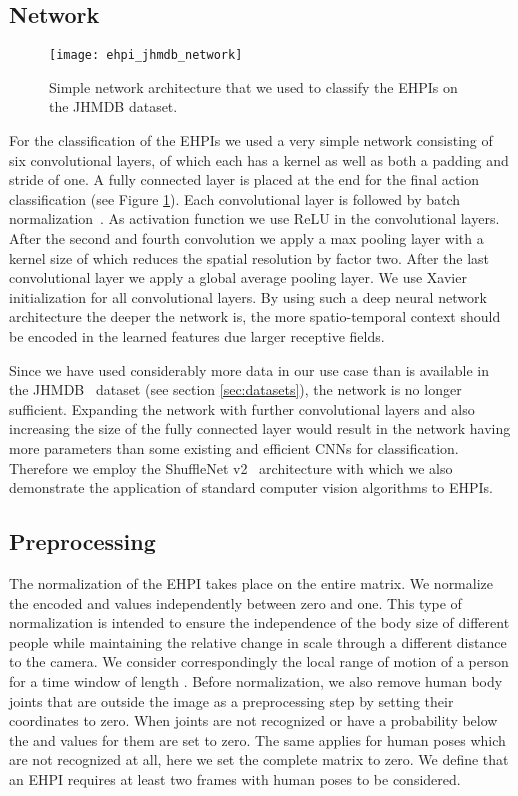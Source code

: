 \documentclass[a4paper, 10pt, conference]{ieeeconf}
\begin{document}
\begin{minipage}{\textwidth}
\subsection{Network}
\begin{figure}
  \centering
  \texttt{[image: ehpi\_jhmdb\_network]}
  \caption{Simple network architecture that we used to classify the EHPIs on the JHMDB dataset.}
  \label{fig:ehpi_jhmdb_network}
\end{figure}
For the classification of the EHPIs we used a very simple network consisting of six convolutional layers, of which each has a  kernel as well as both a padding and stride of one. A fully connected layer is placed at the end for the final action classification (see Figure \ref{fig:ehpi_jhmdb_network}). Each convolutional layer is followed by batch normalization~\cite{ioffeBatchNormalizationAccelerating2015}. As activation function we use ReLU in the convolutional layers. After the second and fourth convolution we apply a max pooling layer with a kernel size of  which reduces the spatial resolution by factor two. After the last convolutional layer we apply a global average pooling layer. We use Xavier initialization \cite{glorotUnderstandingDifficultyTraining2010} for all convolutional layers. By using such a deep neural network architecture the deeper the network is, the more spatio-temporal context should be encoded in the learned features due larger receptive fields.

Since we have used considerably more data in our use case than is available in the JHMDB~\cite{jhuangUnderstandingActionRecognition2013} dataset (see section \ref{sec:datasets}), the network is no longer sufficient. Expanding the network with further convolutional layers and also increasing the size of the fully connected layer would result in the network having more parameters than some existing and efficient CNNs for classification. Therefore we employ the ShuffleNet v2~\cite{maShuffleNetV2Practical2018} architecture with which we also demonstrate the application of standard computer vision algorithms to EHPIs.

\subsection{Preprocessing}
\label{subsec:preprocessing}
The normalization of the EHPI takes place on the entire  matrix. We normalize the encoded  and  values independently between zero and one. This type of normalization is intended to ensure the independence of the body size of different people while maintaining the relative change in scale through a different distance to the camera. We consider correspondingly the local range of motion of a person for a time window of length . Before normalization, we also remove human body joints that are outside the image as a preprocessing step by setting their coordinates to zero. When joints are not recognized or have a probability below  the  and  values for them are set to zero. The same applies for human poses which are not recognized at all, here we set the complete  matrix to zero. We define that an EHPI requires at least two frames with human poses to be considered.


\end{minipage}
\end{document}
